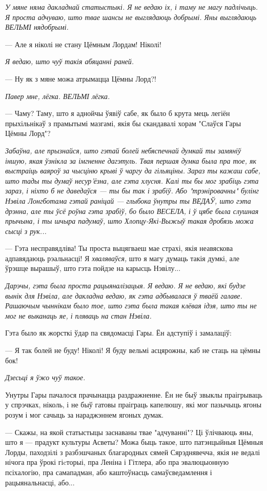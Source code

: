 \emph{У мяне няма дакладнай статыстыкі. Я не ведаю іх, і таму не магу падлічыць.
Я проста адчуваю, што твае шансы не выглядаюць добрымі. Яны выглядаюць ВЕЛЬМІ нядобрымі.}

--- Але я ніколі не стану Цёмным Лордам! Ніколі!

\emph{Я ведаю, што чуў такія абяцанні раней.}

--- Ну як з мяне можа атрымацца Цёмны Лорд?!

\emph{Павер мне, лёгка. ВЕЛЬМІ лёгка.}

--- Чаму? Таму, што я аднойчы ўявіў сабе, як было б крута мець 
легіён прыхільнікаў з прамытымі мазгамі, якія бы скандавалі хорам "Слаўся Гары Цёмны Лорд"?

\emph{Забаўна, але прызнайся, што гэтай болей небяспечнай думкай ты замяніў іншую, якая
ўзнікла за імгненне дагэтуль. Твая першая думка была пра тое, як выстраіць ваяроў за 
чысціню крыві ў чаргу да гільяціны. Зараз ты кажаш сабе, што тады ты думаў несур'ёзна,
але гэта хлусня. Калі ты бы мог зрабіць гэта зараз, і ніхто б не даведаўся --- ты бы так і 
зрабіў. Або "трэніровачны" булінг Нэвіла Лонгботама гэтай раніцай --- глыбока ўнутры ты 
ВЕДАЎ, што гэта дрэнна, але ты ўсё роўна гэта зрабіў, бо было ВЕСЕЛА, і ў цябе 
была слушная прычына, і ты шчыра падумаў, што Хлопцу-Які-Выжыў такая дробязь можа
сысці з рук...}

---  Гэта несправядліва! Ты проста выцягваеш мае страхі, якія неавяскова 
адпавядаюць рэальнасці! Я \emph{хваляваўся,} што я магу думаць такія думкі, але ўрэшце
вырашыў, што гэта пойдзе на карысць Нэвілу...

\emph{Дарэчы, гэта была проста рацыяналізацыя. Я ведаю. Я не ведаю, які будзе
вынік для Нэвіла, але дакладна ведаю, як гэта адбывалася ў тваёй галаве.
Рашаючым чыннікам было тое, што гэта была такая клёвая ідэя, што ты не мог 
не выканаць яе, і пляваць на стан Нэвіла.}

Гэта было як жорсткі ўдар па свядомасці Гары. Ён адступіў і замалаціў:

--- Я так болей не буду! Ніколі! Я буду вельмі асцярожны, каб не стаць на цёмны бок!

\emph{Дзесьці я ўжо чуў такое.}

Унутры Гары пачалося прачынацца раздражненне. Ён не быў звыклы праігрываць у 
спрэчках, ніколь, і не быў гатовы праіграць капелюшу, які мог пазычыць ягоны розум
і мог сачыць за нараджэннем ягоных думак. 

--- Скажы, на якой статыстыцы заснаваны твае "адчуванні"? Ці ўлічваюць яны,
што я --- прадукт культуры Асветы? Можа быць такое, што патэнцыйныя Цёмныя Лорды,
паходзілі з разбэшчаных благародных сямей Сярэднявечча, якія не ведалі нічога пра
ўрокі гіcторыі, пра Леніна і Гітлера, або пра эвалюцыонную псіхалогію, пра самападман,
або каштоўнасць самаўсведамлення і рацыянальнасці, або...


